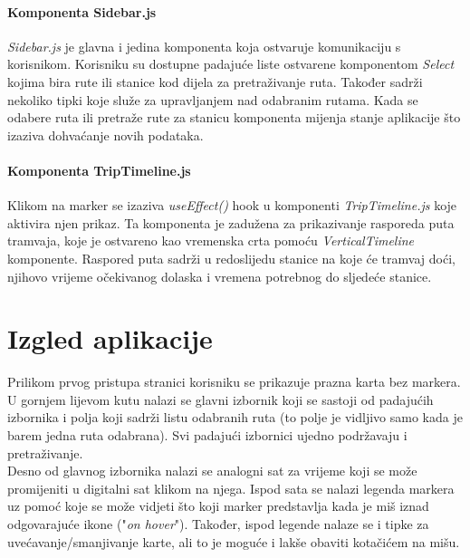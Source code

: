 \documentclass[zavrsnirad]{fer}
\begin{document}
\subsubsection{Komponenta Sidebar.js}
\textit{Sidebar.js} je glavna i jedina komponenta koja ostvaruje komunikaciju s korisnikom. Korisniku su dostupne padajuće liste ostvarene komponentom \textit{Select} kojima bira rute ili stanice kod dijela za pretraživanje ruta. Također sadrži nekoliko tipki koje služe za upravljanjem nad odabranim rutama. Kada se odabere ruta ili pretraže rute za stanicu komponenta mijenja stanje aplikacije što izaziva dohvaćanje novih podataka.

\subsubsection{Komponenta TripTimeline.js}
Klikom na marker se izaziva \textit{useEffect()} hook u komponenti \textit{TripTimeline.js} koje aktivira njen prikaz. Ta komponenta je zadužena za prikazivanje rasporeda puta tramvaja, koje je ostvareno kao vremenska crta pomoću \textit{VerticalTimeline} komponente. Raspored puta sadrži u redoslijedu stanice na koje će tramvaj doći, njihovo vrijeme očekivanog dolaska i vremena potrebnog do sljedeće stanice.

\newpage
\chapter{Izgled aplikacije}
Prilikom prvog pristupa stranici korisniku se prikazuje prazna karta bez markera. U gornjem lijevom kutu nalazi se glavni izbornik koji se sastoji od padajućih izbornika i polja koji sadrži listu odabranih ruta (to polje je vidljivo samo kada je barem jedna ruta odabrana). Svi padajući izbornici ujedno podržavaju i pretraživanje.\\
Desno od glavnog izbornika nalazi se analogni sat za vrijeme koji se može promijeniti u digitalni sat klikom na njega. Ispod sata se nalazi legenda markera uz pomoć koje se može vidjeti što koji marker predstavlja kada je miš iznad odgovarajuće ikone ("\textit{on hover}"). Također, ispod legende nalaze se i tipke za uvećavanje/smanjivanje karte, ali to je moguće i lakše obaviti kotačićem na mišu.
\end{document}
